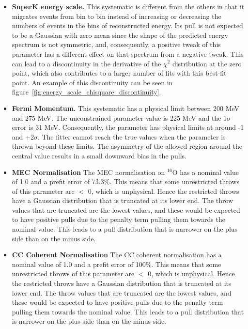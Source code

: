 \begin{itemize}
\item {\bf SuperK energy scale.}
  This systematic is different from the others in that it migrates events from bin to bin instead of increasing or decreasing the 
  numbers of events in the bins of reconstructed energy. Its pull is not expected to be a Gaussian with zero mean since the shape 
  of the predicted energy spectrum is not symmetric, and, consequently, a positive tweak of this parameter has a 
  different effect on that spectrum from a negative tweak.
  This can lead to a discontinuity in the derivative of the $\chi^2$ distribution
  at the zero point, which also contributes to a larger number of fits with this best-fit point.
  An example of this discontinuity can be seen in figure~\ref{fig:energy_scale_chisquare_discontinuity}.
\item {\bf Fermi Momentum.}
  This systematic has a physical limit between 200 MeV and 275 MeV.
  The unconstrained parameter value is 225 MeV and the 1$\sigma$ error is 31 MeV.
  Consequently, the parameter has physical limits at around -1 and +2$\sigma$.
  The fitter cannot reach the true values when the parameter is thrown beyond these limits.
  The asymmetry of the allowed region around the central value results in a small downward bias in the pulls.
\item {\bf MEC Normalisation}
  The MEC normalisation on $^{16}$O has a nominal value of 1.0 and a prefit error of 73.3\%. This means that some unrestricted throws of 
  this parameter are $<$ 0, which is unphysical. Hence the restricted throws have a Gaussian distribution that is truncated at its lower 
  end. The throw values that are truncated are the lowest values, and these would be expected to have positive pulls due to the penalty 
  term pulling them towards the nominal value. This leads to a pull distribution that is narrower on the plus side than on the minus side.    
\item {\bf CC Coherent Normalisation}
  The CC coherent normalisation has a nominal value of 1.0 and a prefit error of 100\%. This means that some unrestricted throws of
  this parameter are $<$ 0, which is unphysical. Hence the restricted throws have a Gaussian distribution that is truncated at its lower
  end. The throw values that are truncated are the lowest values, and these would be expected to have positive pulls due to the penalty
  term pulling them towards the nominal value. This leads to a pull distribution that is narrower on the plus side than on the minus side.

\end{itemize}
